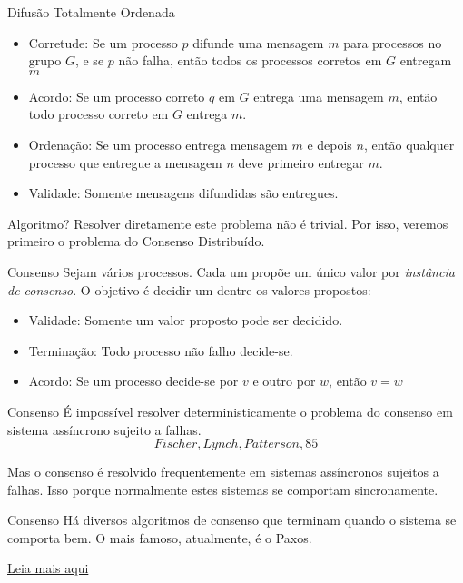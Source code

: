 \begin{frame}{Difusão Totalmente Ordenada}
\begin{itemize}
\item Corretude: Se um processo $p$ difunde uma mensagem $m$ para processos no grupo $G$, e se $p$ não falha, então todos os processos corretos em $G$ entregam $m$

\item Acordo: Se um processo correto $q$ em $G$ entrega uma mensagem $m$, então todo processo correto em $G$ entrega $m$.

\item Ordenação: Se um processo entrega mensagem $m$ e depois $n$, então qualquer processo que entregue a mensagem $n$ deve primeiro entregar $m$.

\item Validade: Somente mensagens difundidas são entregues.
\end{itemize}

\pause Algoritmo?
\pause Resolver diretamente este problema não é trivial. Por isso, veremos primeiro o problema do Consenso Distribuído.
\end{frame}


\begin{frame}{Consenso}
Sejam vários processos. Cada um propõe um único valor por \emph{instância de consenso}. O objetivo é decidir um dentre os valores propostos:
\begin{itemize}
	\item Validade: Somente um valor proposto pode ser decidido.
	\item Terminação: Todo processo não falho decide-se.
	\item Acordo: Se um processo decide-se por $v$ e outro por $w$, então $v = w$
\end{itemize}
\end{frame}

\begin{frame}{Consenso}
É impossível resolver deterministicamente o problema do consenso em sistema assíncrono sujeito a falhas. \[Fischer, Lynch, Patterson, 85\]

\pause Mas o consenso é resolvido frequentemente em sistemas assíncronos sujeitos a falhas. Isso porque normalmente estes sistemas se comportam sincronamente.
\end{frame}



\begin{frame}{Consenso}
Há diversos algoritmos de consenso que terminam quando o sistema se comporta bem. O mais famoso, atualmente, é o Paxos.


\href{http://paxos.systems/index.html}{Leia mais aqui}

\end{frame}

